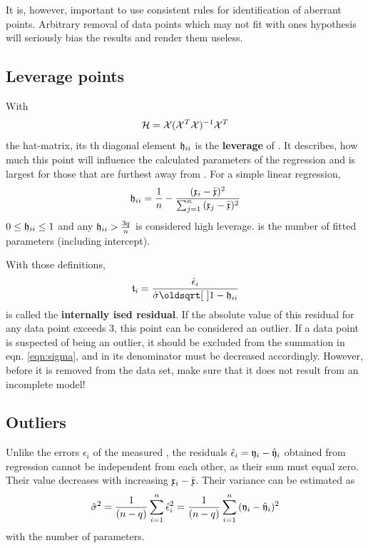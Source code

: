 \begin{refsection}
It is, however, important to use consistent rules for identification of aberrant points. Arbitrary removal of data points which may not fit with ones hypothesis will seriously bias the results and render them useless.

\subsection{Leverage points}

With
\begin{equation}\label{eqn:leverage}
  \mathcal{H} = \mathcal{X} (\mathcal{X}^T \mathcal{X})^{-1} \mathcal{X}^T
\end{equation}
the hat-matrix, its th diagonal element \(\mathfrak{h}_{ii} \) is the \textbf{leverage} of . It describes, how much this point will influence the calculated parameters of the regression and is largest for those  that are furthest away from . For a simple linear regression,
\begin{equation}
  \mathfrak{h}_{ii} = \frac{1}{n} - \frac{(\mathfrak{x}_i - \bar{\mathfrak{x}})^2}{\sum_{j=1}^n{(\mathfrak{x}_j - \bar{\mathfrak{x}})^2}}
\end{equation}
\( 0 \leq \mathfrak{h}_{ii} \leq 1 \) and any \( \mathfrak{h}_{ii} > \frac{3q}{n} \) is considered high leverage.  is the number of fitted parameters (including intercept).

With those definitions,
\begin{equation}
  \AbsVec{t}_i = \frac{\hat{\epsilon}_i}{\hat{\sigma} \sqrt{1-\AbsVec{h}_{ii}}}
\end{equation}
is called the \textbf{internally ised residual}. If the absolute value of this residual for any data point exceeds 3, this point can be considered an outlier. If a data point is suspected of being an outlier, it should be excluded from the summation in eqn. \ref{eqn:sigma}, and  in its denominator must be decreased accordingly. However, before it is removed from the data set, make sure that it does not result from an incomplete model!

\subsection{Outliers}

Unlike the errors \(\epsilon_i \) of the measured , the residuals \(\hat{\epsilon}_i = \mathfrak{y}_i - \hat{\mathfrak{y}}_i \) obtained from regression cannot be independent from each other, as their sum must equal zero. Their value decreases with increasing \(\mathfrak{x}_i - \bar{\mathfrak{x}} \). Their variance can be estimated as
\begin{equation}\label{eqn:sigma}
  \hat{\sigma}^2 = \frac{1}{(n-q)} \sum_{i=1}^n{\hat{\epsilon}_i^2} = \frac{1}{(n-q)} \sum_{i=1}^n{(\mathfrak{y}_i - \hat{\mathfrak{y}}_i)^2}
\end{equation}
with  the number of parameters.


\end{refsection}
